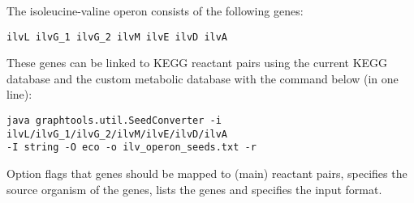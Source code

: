 The isoleucine-valine operon consists of the following genes:

\begin{lstlisting}
ilvL ilvG_1 ilvG_2 ilvM ilvE ilvD ilvA
\end{lstlisting}

These genes can be linked to KEGG reactant pairs using the current KEGG
database and the custom metabolic database with the command below (in one line):

\begin{verbatim}
java graphtools.util.SeedConverter -i ilvL/ilvG_1/ilvG_2/ilvM/ilvE/ilvD/ilvA 
-I string -O eco -o ilv_operon_seeds.txt -r
\end{verbatim}

Option  flags that genes should be mapped to (main) reactant pairs,
 specifies the source organism of the genes,  lists the
genes and  specifies the input format.
